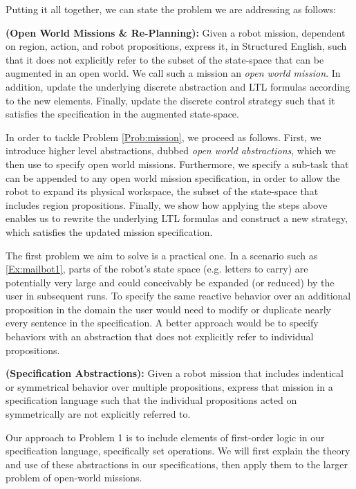 Putting it all together, we can state the problem we are addressing as follows:

\begin{myProblem}\label{Prob:mission}
	\textbf{(Open World Missions \& Re-Planning):} 
	Given a robot mission, dependent on region, action, and robot propositions, express it, in Structured English, such that it does not explicitly refer to the subset of the state-space that can be augmented in an open world. We call such a mission an \emph{open world mission}. In addition, update the underlying discrete abstraction and LTL formulas according to the new elements. Finally, update the discrete control strategy such that it satisfies the specification in the augmented state-space.
\end{myProblem}

In order to tackle Problem \ref{Prob:mission}, we proceed as follows. First, we introduce higher level abstractions, dubbed \emph{open world abstractions}, %
which we then use to specify open world missions. Furthermore, we specify a sub-task that can be appended to any open world mission specification, in order to allow the robot to expand its physical workspace, the subset of the state-space that includes region propositions. Finally, we  show how applying the steps above enables us to rewrite the underlying LTL formulas and construct a new strategy, which satisfies the updated mission specification. 

The first problem we aim to solve is a practical one. In a scenario such as \ref{Ex:mailbot1}, parts of the robot's state space (e.g. letters to carry)  are potentially very large and could conceivably be expanded (or reduced) by the user in subsequent runs. To specify the same reactive behavior over an additional proposition in the domain the user would need to modify or duplicate nearly every sentence in the specification. A better approach would be to specify behaviors with an abstraction that does not explicitly refer to individual propositions.  

\begin{myProblem}\label{Prop:groups}
	\textbf{(Specification Abstractions):}
	Given a robot mission that includes indentical or symmetrical behavior over multiple propositions, express that mission in a specification language such that the individual propositions acted on symmetrically are not explicitly referred to. 
\end{myProblem}

Our approach to Problem 1 is to include elements of first-order logic in our specification language, specifically set operations. We will first explain the theory and use of these abstractions in our specifications, then apply them to the larger problem of open-world missions. 

